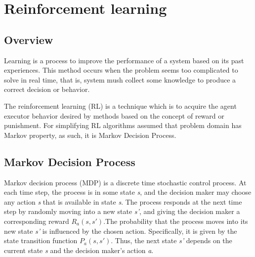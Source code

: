 \documentclass[12pt]{article}
\begin{document}

\tableofcontents
\pagebreak


\section{Reinforcement learning}
\subsection{Overview}{
Learning is a process to improve the performance of a system based on its past experiences. \cite{hatem} This method occurs when the problem seems too complicated to solve in real time, that is, system mush collect some knowledge to produce a correct decision or behavior.\par
The reinforcement learning (RL) is a technique which is to acquire the agent executor behavior desired by methods based on the concept of reward or punishment. \cite{hatem} For simplifying RL algorithms assumed that problem domain has Markov property, as such, it is Markov Decision Process.
}
\subsection{Markov Decision Process}{
Markov decision process (MDP) is a discrete time stochastic control process. At each time step, the process is in some state \textit{s}, and the decision maker may choose any action \textit{s} that is available in state \textit{s}. The process responds at the next time step by randomly moving into a new state \textit{s'}, and giving the decision maker a corresponding reward  $R_a(s,s')$.The probability that the process moves into its new state \textit{s'} is influenced by the chosen action. Specifically, it is given by the state transition function $P_a(s,s')$. Thus, the next state \textit{s'} depends on the current state \textit{s} and the decision maker's action \textit{a}. \citep{wiki:mdp}
}
\end{document}
